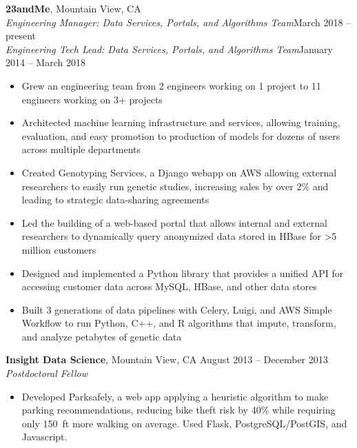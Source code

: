 \documentclass[margin,line]{resume}
\begin{document}
\begin{resume}
    \textbf{23andMe}, Mountain View, CA \hfill\vspace{1mm}\\\vspace{1mm}%
    \textsl{Engineering Manager: Data Services, Portals, and Algorithms Team}\hfill March 2018 -- present\vspace{1mm}\\\vspace{-3mm}%
    \textsl{Engineering Tech Lead: Data Services, Portals, and Algorithms Team}\hfill January 2014 -- March 2018\\%
    \begin{itemize}
    \item Grew an engineering team from 2 engineers working on 1 project to 11 engineers working on 3+ projects
    \item Architected machine learning infrastructure and services, allowing training, evaluation, and easy promotion to production of models for dozens of users across multiple departments
    \item Created Genotyping Services, a Django webapp on AWS allowing external researchers to easily run genetic studies, increasing sales by over 2\% and leading to strategic data-sharing agreements
    \item Led the building of a web-based portal that allows internal and external researchers to dynamically query anonymized data stored in HBase for \textgreater 5 million customers
    \item Designed and implemented a Python library that provides a unified API for accessing customer data across MySQL, HBase, and other data stores
    \item Built 3 generations of data pipelines with Celery, Luigi, and AWS Simple Workflow to run Python, C++, and R algorithms that impute, transform, and analyze petabytes of genetic data
    \end{itemize}
    
    \textbf{Insight Data Science}, Mountain View, CA \hfill August 2013 -- December 2013\vspace{1mm}\\\vspace{1mm}%
    \textsl{Postdoctoral Fellow}
    \begin{itemize}
    \item Developed Parksafely, a web app applying a heuristic algorithm to make parking recommendations, reducing bike theft risk by 40\% while requiring only 150~ft more walking on average. Used Flask, PostgreSQL/PostGIS, and Javascript.
    \end{itemize}


\end{resume}
\end{document}
